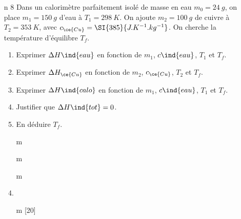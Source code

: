 \documentclass[a4paper, 10pt, final, garamond]{book}
\begin{document}
\begin{enumerate}[label=\sqenumi]
{{		}%
	}%
	\item[n]{8}
	Dans un calorimètre parfaitement isolé de masse en eau $m_0 = \SI{24}{g}$, on
	place $m_1 = \SI{150}{g}$ d'eau à $T_1 = \SI{298}{K}$. On ajoute $m_2 =
		\SI{100}{g}$ de cuivre à $T_2 = \SI{353}{K}$, avec $c_{\ce{Cu}} =
		\SI{385}{J.K^{-1}.kg^{-1}}$. On cherche la température d'équilibre $T_f$.
	\begin{enumerate}[label=\sqenumi]
		\item Exprimer $\Delta{H}\ind{eau}$ en fonction de $m_1$, $c\ind{eau}$,
		      $T_1$ et $T_f$.
		\item Exprimer $\Delta{H}_{\ce{Cu}}$ en fonction de $m_2$, $c_{\ce{Cu}}$,
		      $T_2$ et $T_f$.
		\item Exprimer $\Delta{H}\ind{calo}$ en fonction de $m_1$, $c\ind{eau}$,
		      $T_1$ et $T_f$.
		\item Justifier que $\Delta{H}\ind{tot} = 0$.
		\item En déduire $T_f$.
	\end{enumerate}
	\smallbreak
	\begin{enumerate}[label=\sqenumi]
		\item[m]
		\item[m]
		\item[m]
		\item {}%
		\item [m][20]
\end{enumerate}
\end{enumerate}
\end{document}
